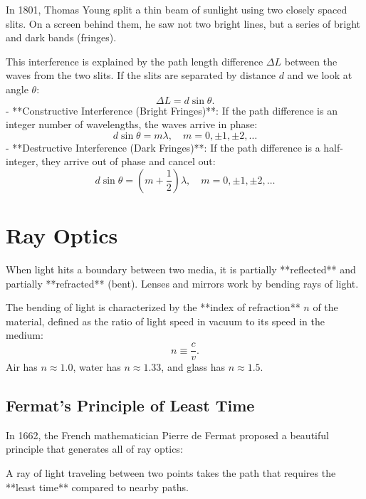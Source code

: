 In 1801, Thomas Young split a thin beam of sunlight using two closely spaced slits. On a screen behind them, he saw not two bright lines, but a series of bright and dark bands (fringes). 

This interference is explained by the path length difference $\Delta L$ between the waves from the two slits. If the slits are separated by distance $d$ and we look at angle $\theta$:
\begin{equation}
    \Delta L = d\sin\theta.
\end{equation}
- **Constructive Interference (Bright Fringes)**: If the path difference is an integer number of wavelengths, the waves arrive in phase:
  \begin{equation}
      d\sin\theta = m\lambda, \quad m = 0, \pm 1, \pm 2, \dots
  \end{equation}
- **Destructive Interference (Dark Fringes)**: If the path difference is a half-integer, they arrive out of phase and cancel out:
  \begin{equation}
      d\sin\theta = \left(m + \frac{1}{2}\right)\lambda, \quad m = 0, \pm 1, \pm 2, \dots
  \end{equation}

\section{Ray Optics}

When light hits a boundary between two media, it is partially **reflected** and partially **refracted** (bent). Lenses and mirrors work by bending rays of light.

The bending of light is characterized by the **index of refraction** $n$ of the material, defined as the ratio of light speed in vacuum to its speed in the medium:
\begin{equation}
    n \equiv \frac{c}{v}.
\end{equation}
Air has $n \approx 1.0$, water has $n \approx 1.33$, and glass has $n \approx 1.5$.

\subsection{Fermat's Principle of Least Time}

In 1662, the French mathematician Pierre de Fermat proposed a beautiful principle that generates all of ray optics:

\begin{keybox}
A ray of light traveling between two points takes the path that requires the **least time** compared to nearby paths.
\end{keybox}


